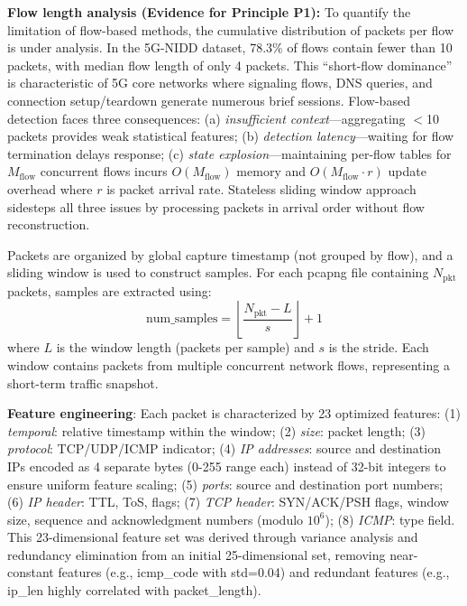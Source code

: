\documentclass[lettersize,journal]{IEEEtran}
\begin{document}
\textbf{Flow length analysis (Evidence for Principle P1):} To quantify the limitation of flow-based methods, the cumulative distribution of packets per flow is under analysis. In the 5G-NIDD dataset, 78.3\% of flows contain fewer than 10 packets, with median flow length of only 4 packets. This ``short-flow dominance'' is characteristic of 5G core networks where signaling flows, DNS queries, and connection setup/teardown generate numerous brief sessions. Flow-based detection faces three consequences: (a) \textit{insufficient context}---aggregating $<$10 packets provides weak statistical features; (b) \textit{detection latency}---waiting for flow termination delays response; (c) \textit{state explosion}---maintaining per-flow tables for $M_{\text{flow}}$ concurrent flows incurs $O(M_{\text{flow}})$ memory and $O(M_{\text{flow}} \cdot r)$ update overhead where $r$ is packet arrival rate. Stateless sliding window approach sidesteps all three issues by processing packets in arrival order without flow reconstruction.

\noindent Packets are organized by global capture timestamp (not grouped by flow), and a sliding window is used to construct samples. For each pcapng file containing $N_{\text{pkt}}$ packets, samples are extracted using:
\begin{equation}
\text{num\_samples} = \left\lfloor \frac{N_{\text{pkt}} - L}{s} \right\rfloor + 1
\end{equation}
where $L$ is the window length (packets per sample) and $s$ is the stride. Each window contains packets from multiple concurrent network flows, representing a short-term traffic snapshot.

\textbf{Feature engineering}: Each packet is characterized by 23 optimized features: (1) \textit{temporal}: relative timestamp within the window; (2) \textit{size}: packet length; (3) \textit{protocol}: TCP/UDP/ICMP indicator; (4) \textit{IP addresses}: source and destination IPs encoded as 4 separate bytes (0-255 range each) instead of 32-bit integers to ensure uniform feature scaling; (5) \textit{ports}: source and destination port numbers; (6) \textit{IP header}: TTL, ToS, flags; (7) \textit{TCP header}: SYN/ACK/PSH flags, window size, sequence and acknowledgment numbers (modulo $10^6$); (8) \textit{ICMP}: type field. This 23-dimensional feature set was derived through variance analysis and redundancy elimination from an initial 25-dimensional set, removing near-constant features (e.g., icmp\_code with std=0.04) and redundant features (e.g., ip\_len highly correlated with packet\_length).
\end{document}
